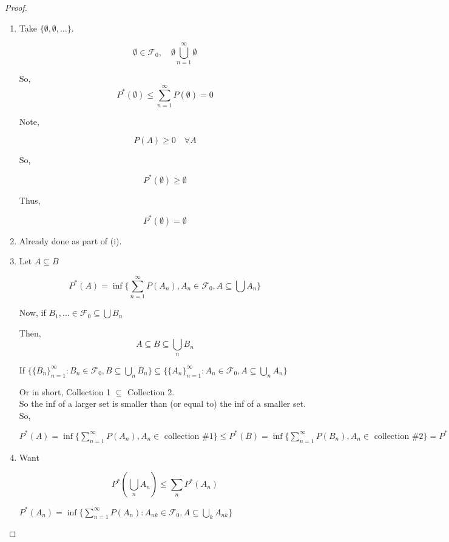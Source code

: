 \documentclass[11pt,fleqn]{book} %
\begin{document}
\begin{proof}
	
	\begin{enumerate}[label = (\roman*)]
		\item Take $\{\emptyset, \emptyset, \dots \}$. 

		$$\emptyset \in \mathcal{F}_0, \quad \emptyset \bigcup^\infty_{n=1} \emptyset $$

		So, \\
		$$P^*(\emptyset) \leq \displaystyle \sum^\infty_{n=1} P(\emptyset) = 0$$

		Note,

		$$P(A) \geq 0 \quad \forall A$$

		So, 

		$$P^*(\emptyset) \geq \emptyset$$ 

		Thus,

		 $$P^*(\emptyset) = \emptyset$$
		\item  Already done as part of (i).

		\item  Let $A \subseteq B$

		$$P^*(A) = \inf\{\displaystyle \sum^\infty_{n=1} P(A_n), A_n \in \mathcal{F}_0, A \subseteq \bigcup A_n \} $$

		Now, if $B_1, \dots \in \mathcal{F}_0 \subseteq \bigcup B_n$

		Then, 
		$$A \subseteq B \subseteq \bigcup_n B_n $$

		If  $\{ \{B_n\}^\infty_{n=1}: B_n \in \mathcal{F}_0, B \subseteq \bigcup_n B_n \} \subseteq \{ \{A_n\}^\infty_{n=1}: A_n \in \mathcal{F}_0, A \subseteq \bigcup_n A_n \}$

		Or in short, Collection 1 $\subseteq$ Collection 2.\\

		So the inf of a larger set is smaller than (or equal to) the inf of a smaller set.\\
		
		So, 

		$P^*(A) = \inf\{\displaystyle \sum^\infty_{n=1} P(A_n), A_n \in  \text{ collection \#1}\} \leq P^*(B) = \inf\{\displaystyle \sum^\infty_{n=1} P(B_n), A_n \in  \text{ collection \#2}\} = P^*(B)$

		\item Want 

		$$P^*(\bigcup_n A_n) \leq \displaystyle\sum_n P^*(A_n) $$

		$P^*(A_n) = \inf \{\displaystyle \sum_{n=1}^\infty P(A_n): A_{nk} \in \mathcal{F}_0,  A \subseteq \bigcup_{k} A_{nk}\}$\\


\end{enumerate}
\end{proof}
\end{document}
